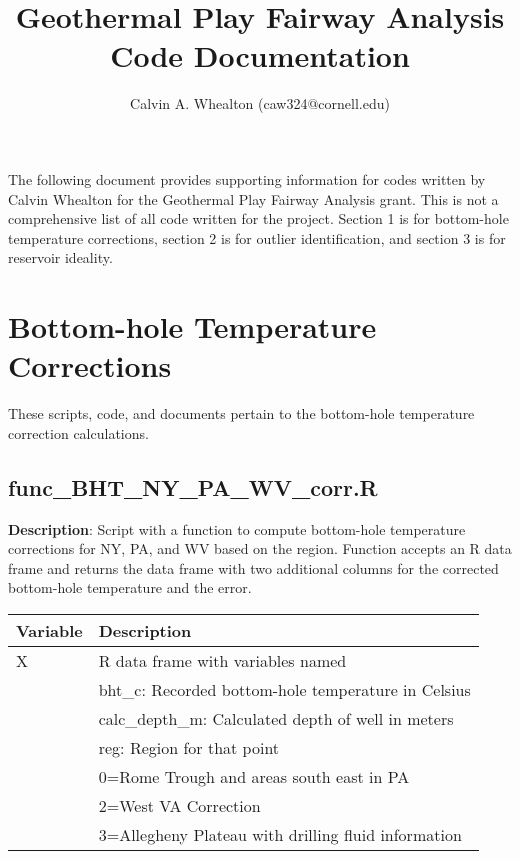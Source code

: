 \documentclass[12pt,a4paper]{article}
\author{Calvin A. Whealton (caw324@cornell.edu)}
\title{Geothermal Play Fairway Analysis Code Documentation}
\begin{document}
\maketitle

\tableofcontents

\newpage

The following document provides supporting information for codes written by Calvin Whealton for the Geothermal Play Fairway Analysis grant. This is not a comprehensive list of all code written for the project. Section 1 is for bottom-hole temperature corrections, section 2 is for outlier identification, and section 3 is for reservoir ideality. 

\section*{Bottom-hole Temperature Corrections}

These scripts, code, and documents pertain to the bottom-hole temperature correction calculations.

\subsection*{\textsf{func\_BHT\_NY\_PA\_WV\_corr.R}}

\textbf{Description}: Script with a function to compute bottom-hole temperature corrections for NY, PA, and WV based on the region. Function accepts an R data frame and returns the data frame with two additional columns for the corrected bottom-hole temperature and the error.

\begin{table}[H]
\begin{tabular} {p{2cm} p{11cm}}
\hline
\textbf{Variable} & \textbf{Description}\\
\hline
\textsf{X} 			 & R data frame with variables named\\
 & \textsf{bht\_c}: Recorded bottom-hole temperature in Celsius\\
 & \textsf{calc\_depth\_m}: Calculated depth of well in meters\\
 & \textsf{reg}:  Region for that point\\
 & 0=Rome Trough and areas south east in PA \\
 & 2=West VA Correction\\
 & 3=Allegheny Plateau with drilling fluid information\\
\hline
\end{tabular} 
\end{table}
\end{document}
